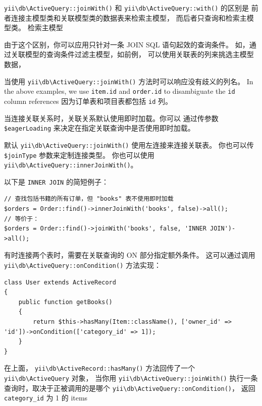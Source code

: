 \texttt{yii{\allowbreak{}\textbackslash}db{\allowbreak{}\textbackslash}ActiveQuery\allowbreak{}::\allowbreak{}joinWith()} 和  \texttt{yii{\allowbreak{}\textbackslash}db{\allowbreak{}\textbackslash}ActiveQuery\allowbreak{}::\allowbreak{}with()} 的区别是
前者连接主模型类和关联模型类的数据表来检索主模型，
而后者只查询和检索主模型类。
检索主模型

由于这个区别，你可以应用只针对一条 JOIN SQL 语句起效的查询条件。
如，通过关联模型的查询条件过滤主模型，如前例，
可以使用关联表的列来挑选主模型数据，

当使用 \texttt{yii{\allowbreak{}\textbackslash}db{\allowbreak{}\textbackslash}ActiveQuery\allowbreak{}::\allowbreak{}joinWith()} 方法时可以响应没有歧义的列名。
In the above examples, we use \lstinline|item.id| and \lstinline|order.id| to disambiguate the \lstinline|id| column references
因为订单表和项目表都包括 \lstinline|id| 列。

当连接关联关系时，关联关系默认使用即时加载。你可以
通过传参数 \lstinline|$eagerLoading| 来决定在指定关联查询中是否使用即时加载。

默认 \texttt{yii{\allowbreak{}\textbackslash}db{\allowbreak{}\textbackslash}ActiveQuery\allowbreak{}::\allowbreak{}joinWith()} 使用左连接来连接关联表。
你也可以传 \lstinline|$joinType| 参数来定制连接类型。
你也可以使用 \texttt{yii{\allowbreak{}\textbackslash}db{\allowbreak{}\textbackslash}ActiveQuery\allowbreak{}::\allowbreak{}innerJoinWith()}。

以下是 \lstinline|INNER JOIN| 的简短例子：

\lstset{language=php}\begin{lstlisting}
// 查找包括书籍的所有订单，但 "books" 表不使用即时加载
$orders = Order::find()->innerJoinWith('books', false)->all();
// 等价于：
$orders = Order::find()->joinWith('books', false, 'INNER JOIN')->all();
\end{lstlisting}
有时连接两个表时，需要在关联查询的 ON 部分指定额外条件。
这可以通过调用 \texttt{yii{\allowbreak{}\textbackslash}db{\allowbreak{}\textbackslash}ActiveQuery\allowbreak{}::\allowbreak{}onCondition()} 方法实现：

\lstset{language=php}\begin{lstlisting}
class User extends ActiveRecord
{
    public function getBooks()
    {
        return $this->hasMany(Item::className(), ['owner_id' => 'id'])->onCondition(['category_id' => 1]);
    }
}
\end{lstlisting}
在上面， \texttt{yii{\allowbreak{}\textbackslash}db{\allowbreak{}\textbackslash}ActiveRecord\allowbreak{}::\allowbreak{}hasMany()} 方法回传了一个 \texttt{yii{\allowbreak{}\textbackslash}db{\allowbreak{}\textbackslash}ActiveQuery} 对象，
当你用 \texttt{yii{\allowbreak{}\textbackslash}db{\allowbreak{}\textbackslash}ActiveQuery\allowbreak{}::\allowbreak{}joinWith()} 执行一条查询时，取决于正被调用的是哪个 \texttt{yii{\allowbreak{}\textbackslash}db{\allowbreak{}\textbackslash}ActiveQuery\allowbreak{}::\allowbreak{}onCondition()}，
返回 \lstinline|category_id| 为 1 的 items 

